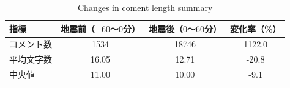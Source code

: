 \begin{table}[htbp]
  \centering
  \caption{Changes in coment length summary}
  \label{tab:statistics_summary_all}
  \begin{tabular}{lccc}
    \hline
    指標 & 地震前（$-60$～$0$分） & 地震後（$0$～$60$分） & 変化率（\%） \\
    \hline
    コメント数 & 1534 & 18746 & 1122.0 \\
    平均文字数 & 16.05 & 12.71 & -20.8 \\
    中央値     & 11.00 & 10.00 & -9.1 \\
    \hline
  \end{tabular}
\end{table}
